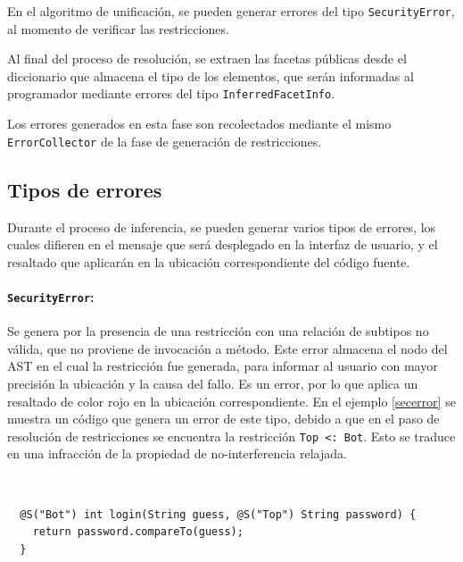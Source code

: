 En el algoritmo de unificación, se pueden generar errores del tipo \texttt{SecurityError}, al momento de verificar las restricciones.

Al final del proceso de resolución, se extraen las facetas públicas desde el diccionario que almacena el tipo de los elementos, que serán informadas al programador mediante errores del tipo \texttt{InferredFacetInfo}.

Los errores generados en esta fase son recolectados mediante el mismo \texttt{ErrorCollector} de la fase de generación de restricciones.


\subsection{Tipos de errores}
Durante el proceso de inferencia, se pueden generar varios tipos de errores, los cuales difieren en el mensaje que será desplegado en la interfaz de usuario, y el resaltado que aplicarán en la ubicación correspondiente del código fuente.

\paragraph{\texttt{SecurityError}:}Se genera por la presencia de una restricción con una relación de subtipos no válida, que no proviene de invocación a método. Este error almacena el nodo del AST en el cual la restricción fue generada, para informar al usuario con mayor precisión la ubicación y la causa del fallo. Es un error, por lo que aplica un resaltado de color rojo en la ubicación correspondiente. En el ejemplo \ref{secerror} se muestra un código que genera un error de este tipo, debido a que en el paso de resolución de restricciones se encuentra la restricción \texttt{Top <: Bot}. Esto se traduce en una infracción de la propiedad de no-interferencia relajada.

\begin{ej}\ \\
  \label{secerror}
  \normalfont
  \begin{lstlisting}
  @S("Bot") int login(String guess, @S("Top") String password) {
    return password.compareTo(guess);
  }
  \end{lstlisting}
\end{ej}

